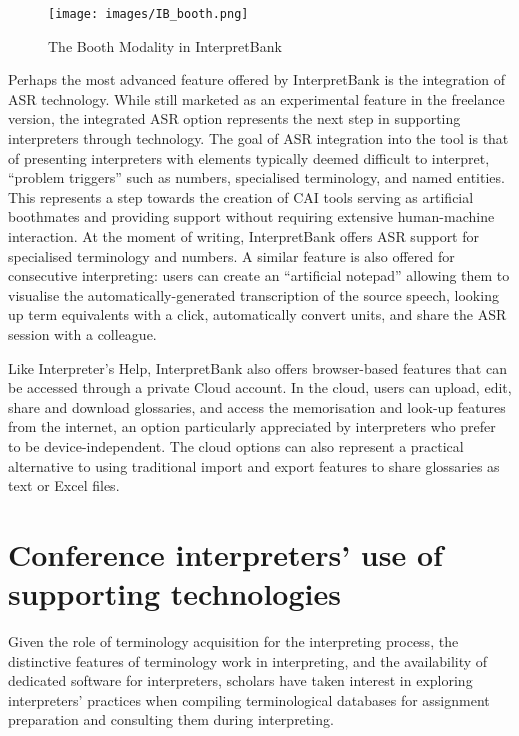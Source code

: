 \begin{figure}
\texttt{[image: images/IB\_booth.png]}
\caption[InterpretBank – Booth Modality]{The Booth Modality in InterpretBank}
\label{fig:IB_booth}
\end{figure}

Perhaps the most advanced feature offered by InterpretBank is the integration of ASR technology. While still marketed as an experimental feature in the freelance version, the integrated ASR option represents the next step in supporting interpreters through technology. The goal of ASR integration into the tool is that of presenting interpreters with elements typically deemed difficult to interpret, ``problem triggers'' \citep{gile_basic_2009} such as numbers, specialised terminology, and named entities. This represents a step towards the creation of CAI tools serving as artificial boothmates and providing support without requiring extensive human-machine interaction. At the moment of writing, InterpretBank offers ASR support for specialised terminology and numbers. A similar feature is also offered for consecutive interpreting: users can create an ``artificial notepad'' allowing them to visualise the automatically-generated transcription of the source speech, looking up term equivalents with a click, automatically convert units, and share the ASR session with a colleague.

Like Interpreter's Help, InterpretBank also offers browser-based features that can be accessed through a private Cloud account. In the cloud, users can upload, edit, share and download glossaries, and access the memorisation and look-up features from the internet, an option particularly appreciated by interpreters who prefer to be device-independent. The cloud options can also represent a practical alternative to using traditional import and export features to share glossaries as text or Excel files.

\section{Conference interpreters' use of supporting technologies} \label{habits_terminology_int}
Given the role of terminology acquisition for the interpreting process, the distinctive features of terminology work in interpreting, and the availability of dedicated software for interpreters, scholars have taken interest in exploring interpreters' practices when compiling terminological databases for assignment preparation and consulting them during interpreting.


